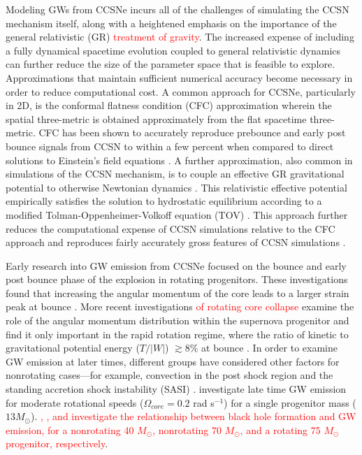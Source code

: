 \documentclass[twocolumn,times]{aastex62}  %
\begin{document}
Modeling GWs from CCSNe incurs all of the challenges of simulating the CCSN mechanism itself, along with a heightened emphasis on the importance of the general relativistic (GR) \textcolor{red}{treatment of gravity}. 
The increased expense of including a fully dynamical spacetime evolution coupled to general relativistic dynamics \citep[cf.][]{ott:2009, ott:2012} can further reduce the size of the parameter space that is feasible to explore. 
Approximations that maintain sufficient numerical accuracy become necessary in order to reduce computational cost.  
A common approach for CCSNe, particularly in 2D, is the conformal flatness condition (CFC) approximation wherein the spatial three-metric is obtained approximately from the flat spacetime three-metric.
CFC has been shown to accurately reproduce prebounce and early post bounce signals from CCSN to within a few percent when compared to direct solutions to Einstein's field equations  \citep{ott:2007}.
A further approximation, also common in simulations of the CCSN mechanism, is to couple an effective GR gravitational potential to otherwise Newtonian dynamics \citep{rampp:2002, marek:2006, bruenn:2016, oconnor:2018, morozova:2018}.  
This relativistic effective potential empirically satisfies the solution to hydrostatic equilibrium according to a modified Tolman-Oppenheimer-Volkoff equation (TOV) \citep{rampp:2002, marek:2006}.
This approach further reduces the computational expense of CCSN simulations relative to the CFC approach and reproduces fairly accurately gross features of CCSN simulations \citep{marek:2006, muller:2012}. 

Early research into GW emission from CCSNe focused on the bounce and early post bounce phase of the explosion in rotating progenitors.
These investigations found that increasing the angular momentum of the core leads to a larger strain peak at bounce \citep{muller:1982,moench:1991,yamada:1995,zwerger:1997,dimm:2002,kotake:2003,shibata:2004}.  
More recent investigations \textcolor{red}{of rotating core collapse} examine the role of the angular momentum distribution within the supernova progenitor and find it only important in the rapid rotation regime, where the ratio of kinetic to gravitational potential energy ($T/|W|$) $ \gtrsim 8\%$ at bounce \citep{abdik:2014}. In order to examine GW emission at later times, different groups have considered other factors for nonrotating cases---for example, convection in the post shock region \citep{burrows:1996,muller:1997,muller:2004,murphy:2009,marek:2009b} and the standing accretion shock instability (SASI) \citep{blondin:2003,blondin:2006,ohnishi:2006,foglizzo:2007,scheck:2008,iwakami:2009,fernandez:2010}.  \citet{moro:2018} investigate late time GW emission for moderate rotational speeds ($\Omega_{core} = 0.2$ rad s$^{-1}$) for a single progenitor mass ($13 M_\odot$).  \textcolor{red}{\citet{pan:2018}, \citet{kuroda:2018}, and \citet{ott:2011} investigate the relationship between black hole formation and GW emission, for a nonrotating 40 $M_\odot$, nonrotating  70 $M_\odot$, and  a rotating 75 $M_\odot$ progenitor, respectively}.
 
\end{document}
